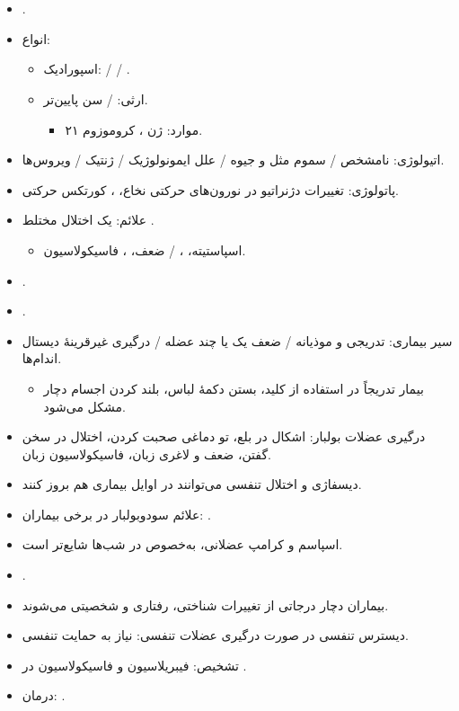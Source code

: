 \documentclass[a4paper,12pt]{extbook}
\begin{document}
\section*{}
\begin{itemize}
\item {}.
\item انواع:
\begin{itemize}
\item اسپورادیک:  /  / .
\item ارثی:  / سن پایین‌تر.
\begin{itemize}
\item {} موارد: ژن ، کروموزوم ۲۱.
\end{itemize}
\end{itemize}
\item اتیولوژی: نامشخص / سموم مثل  و جیوه / علل ایمونولوژیک / ژنتیک / ویروس‌ها.
\item پاتولوژی: تغییرات دژنراتیو در نورون‌های حرکتی نخاع، ، کورتکس حرکتی.
\item علائم: یک اختلال مختلط .
\begin{itemize}
\item اسپاستیته، ،  / ضعف، ، فاسیکولاسیون.
\end{itemize}
\item {} .
\item {}.
\item سیر بیماری: تدریجی و موذیانه / ضعف یک یا چند عضله / درگیری غیرقرینهٔ دیستال اندام‌ها.
\begin{itemize}
\item بیمار تدریجاً در استفاده از کلید، بستن دکمهٔ لباس، بلند کردن اجسام دچار مشکل می‌شود.
\end{itemize}
\item درگیری عضلات بولبار: اشکال در بلع، تو دماغی صحبت کردن، اختلال در سخن گفتن، ضعف و لاغری زبان، فاسیکولاسیون زبان.
\item دیسفاژی و اختلال تنفسی می‌توانند در اوایل بیماری هم بروز کنند.
\item علائم سودوبولبار در برخی بیماران: .
\item اسپاسم و کرامپ عضلانی، به‌خصوص در شب‌ها شایع‌تر است.
\item {}.
\item {} بیماران دچار درجاتی از تغییرات شناختی، رفتاری و شخصیتی می‌شوند.
\item دیسترس تنفسی در صورت درگیری عضلات تنفسی: نیاز به حمایت تنفسی.
\item تشخیص: فیبریلاسیون و فاسیکولاسیون در .
\item درمان: .
\end{itemize}
\end{document}
